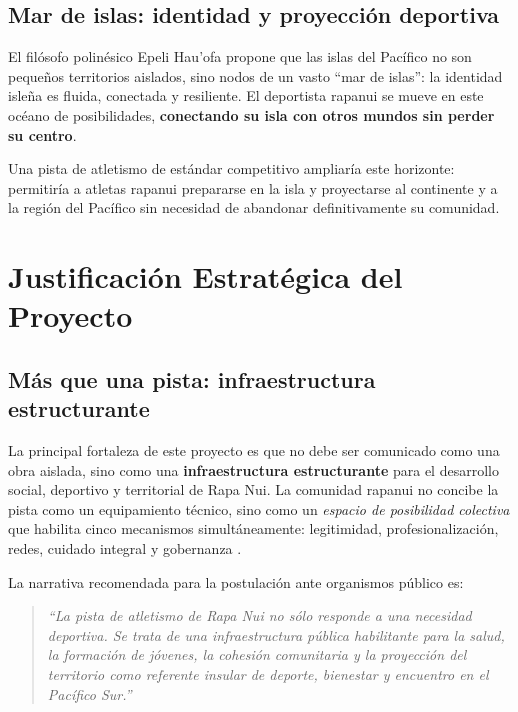 \documentclass[12pt, a4paper]{article}
\begin{document}
\subsection{Mar de islas: identidad y proyección deportiva}

El filósofo polinésico Epeli Hau'ofa \citeyearpar{hauofa1994} propone que las islas
del Pacífico no son pequeños territorios aislados, sino nodos de un vasto ``mar de
islas'': la identidad isleña es fluida, conectada y resiliente. El deportista rapanui
se mueve en este océano de posibilidades, \textbf{conectando su isla con otros mundos
sin perder su centro}.

Una pista de atletismo de estándar competitivo ampliaría este horizonte: permitiría
a atletas rapanui prepararse en la isla y proyectarse al continente y a la región del
Pacífico sin necesidad de abandonar definitivamente su comunidad.

\section{Justificación Estratégica del Proyecto}

\subsection{Más que una pista: infraestructura estructurante}

La principal fortaleza de este proyecto es que no debe ser comunicado como una
obra aislada, sino como una \textbf{infraestructura estructurante} para el
desarrollo social, deportivo y territorial de Rapa Nui. La comunidad rapanui
no concibe la pista como un equipamiento técnico, sino como un \textit{espacio de
posibilidad colectiva} que habilita cinco mecanismos simultáneamente:
legitimidad, profesionalización, redes, cuidado integral y gobernanza
\citep{ortega2026}.

La narrativa recomendada para la postulación ante organismos público es:

\begin{quote}
\textit{``La pista de atletismo de Rapa Nui no sólo responde a una necesidad
deportiva. Se trata de una infraestructura pública habilitante para la salud,
la formación de jóvenes, la cohesión comunitaria y la proyección del
territorio como referente insular de deporte, bienestar y encuentro en el
Pacífico Sur.''}
\end{quote}
\end{document}
